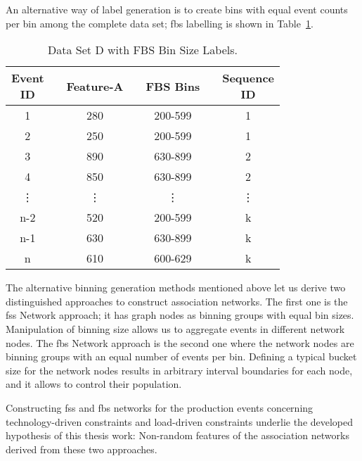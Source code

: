 An alternative way of label generation is to create bins with equal event counts per bin among the complete data set; \ac{fbs} labelling is shown in Table~\ref{Tab: D-dataset-FBS}.
\begin{table}[ht!]
	\centering
	\setlength{\arrayrulewidth}{0.75pt}%
	\caption{Data Set D with FBS Bin Size Labels.}
	\begin{tabular}{|cc|c|ccc|c|}
		\hline \rowcolor[HTML]{FFFFC7}
		\makecell{Event\\ID} 	&& Feature-A    	&& FBS Bins && \makecell{Sequence\\ID} \\ \hline
		1 	      && 280	    && 200-599	&& 1 		     \\
		2 		  && 250	    && 200-599	&& 1 		     \\
		3 	      && 890	    && 630-899	&& 2 		     \\
		4 		  && 850	    && 630-899	&& 2 		     \\
		\vdots	  && \vdots  	&& \vdots	&& \vdots 	     \\
		n-2 	  && 520	    && 200-599	&& k 		     \\
		n-1       && 630	    && 630-899	&& k 		     \\
		n 		  && 610	    && 600-629	&& k 		     \\ \hline
	\end{tabular}
	\label{Tab: D-dataset-FBS}
\end{table}
The alternative binning generation methods mentioned above let us derive two distinguished approaches to construct association networks. The first one is the \acs{fss} Network approach; it has graph nodes as binning groups with equal bin sizes. Manipulation of binning size allows us to aggregate events in different network nodes. The \acs{fbs} Network approach is the second one where the network nodes are binning groups with an equal number of events per bin. Defining a typical bucket size for the network nodes results in arbitrary interval boundaries for each node, and it allows to control their population.


Constructing \acs{fss} and \acs{fbs} networks for the production events concerning technology-driven constraints and load-driven constraints underlie the developed hypothesis of this thesis work: Non-random features of the association networks derived from these two approaches.